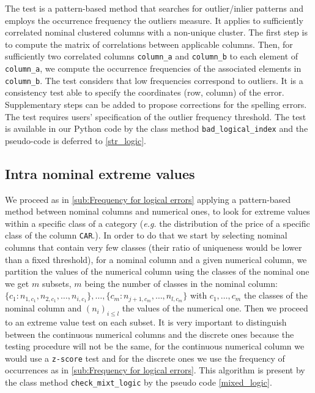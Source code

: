 \documentclass{article}
\begin{document}
The test is a pattern-based method that searches for outlier/inlier patterns and employs the occurrence frequency the outliers measure.
It applies to sufficiently correlated nominal clustered columns with  a non-unique cluster.
The first step is to compute the matrix of correlations between applicable columns.
Then, for sufficiently two correlated columns \texttt{column\_a} and \texttt{column\_b} to each element of \texttt{column\_a}, we compute the occurrence frequencies of the associated elements in \texttt{column\_b}.
The test considers that low frequencies correspond to outliers.
It is a consistency test able to specify the coordinates (row, column) of the error.
Supplementary steps can be added to propose corrections for the spelling errors.
The test requires users’ specification of the outlier frequency threshold.
The test is available in our Python code by the class method \texttt{bad\_logical\_index} and the pseudo-code is deferred to \ref{str_logic}.

\subsection{Intra nominal extreme values} %
\label{sub:Intra nominal extreme values}
We proceed as in \ref{sub:Frequency for logical errors} applying a pattern-based method between nominal columns and numerical ones, to look for extreme values within a specific class of a category (\textit{e.g.} the distribution of the price of a specific class of the column \texttt{CAR}.). In order to do that we start by selecting nominal columns that contain very few classes (their ratio of uniqueness would be lower than a fixed threshold), for a nominal column and a given numerical column, we partition the values of the numerical column using the classes of the nominal one we get $m$ subsets, $m$ being the number of classes in the nominal column: $\{c_1: n_{1, c_1}, n_{2, c_1}, \ldots, n_{i, c_1}\}, \ldots, \{c_m: n_{j+1, c_m}, \ldots,  n_{l, c_m}\}$ with $c_1, \ldots, c_m$ the classes of the nominal column and $(n_i)_{i \leq l}$ the values of the numerical one. Then we proceed to an extreme value test on each subset.
It is very important to distinguish between the continuous numerical columns and the discrete ones because the testing procedure will not be the same, for the continuous numerical column we would use a \texttt{z-score} test and for the discrete ones we use the frequency of occurrences as in \ref{sub:Frequency for logical errors}.
This algorithm is present by the class method \texttt{check\_mixt\_logic} by the pseudo code \ref{mixed_logic}.
\end{document}
